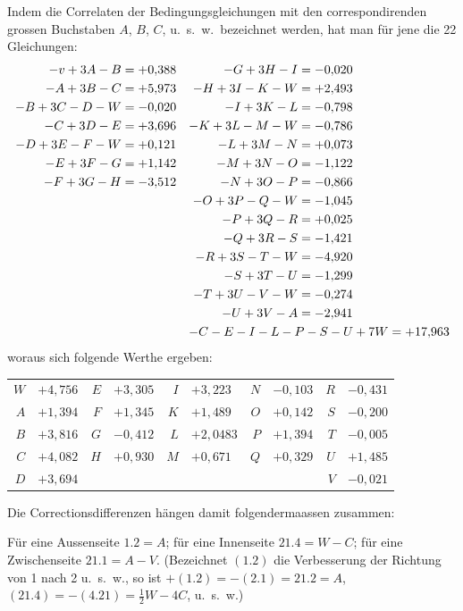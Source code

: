 \documentclass[12pt,a4paper]{article}
\theoremstyle{plain}
\theoremstyle{definition}
\theoremstyle{remark}
\begin{document}
Indem die Correlaten der Bedingungsgleichungen mit den correspondirenden grossen Buchstaben $A$, $B$, $C$, u.\ s.\ w.\ bezeichnet werden, hat man f\"ur jene die 22 Gleichungen:
\begin{align*}
-v + 3A - B &= +0{,}388 & -G + 3H - I &= -0{,}020\\
-A + 3B - C &= +5{,}973 & -H + 3I - K - W &= +2{,}493\\
-B + 3C - D - W &= -0{,}020 & -I + 3K - L &= -0{,}798\\
-C + 3D - E &= +3{,}696 & -K + 3L - M - W &= -0{,}786\\
-D + 3E - F - W &= +0{,}121 & -L + 3M - N &= +0{,}073\\
-E + 3F - G &= +1{,}142 & -M + 3N - O &= -1{,}122\\
-F + 3G - H &= -3{,}512 & -N + 3O - P &= -0{,}866\\
& & -O + 3P - Q - W &= -1{,}045\\
& & -P + 3Q - R &= +0{,}025\\
& & -Q + 3R - S &= -1{,}421\\
& & -R + 3S - T - W &= -4{,}920\\
& & -S + 3T - U &= -1{,}299\\
& & -T + 3U - V - W &= -0{,}274\\
& & -U + 3V - A &= -2{,}941\\
& & \multicolumn{2}{l}{$-C - E - I - L - P - S - U + 7W = +17{,}963$}
\end{align*}
woraus sich folgende Werthe ergeben:
\begin{center}
\begin{tabular}{r@{${}= {}$}lr@{${}= {}$}lr@{${}= {}$}lr@{${}= {}$}lr@{${}= {}$}l}
$W$ & $+4{,}756$ & $E$ & $+3{,}305$ & $I$ & $+3{,}223$ & $N$ & $-0{,}103$ & $R$ & $-0{,}431$\\
$A$ & $+1{,}394$ & $F$ & $+1{,}345$ & $K$ & $+1{,}489$ & $O$ & $+0{,}142$ & $S$ & $-0{,}200$\\
$B$ & $+3{,}816$ & $G$ & $-0{,}412$ & $L$ & $+2{,}0483$ & $P$ & $+1{,}394$ & $T$ & $-0{,}005$\\
$C$ & $+4{,}082$ & $H$ & $+0{,}930$ & $M$ & $+0{,}671$ & $Q$ & $+0{,}329$ & $U$ & $+1{,}485$\\
$D$ & $+3{,}694$ & & & & & & & $V$ & $-0{,}021$
\end{tabular}
\end{center}

Die Correctionsdifferenzen h\"angen damit folgendermaassen zusammen:

F\"ur eine Aussenseite $1.2 = A$; f\"ur eine Innenseite $21.4 = W - C$; f\"ur eine Zwischenseite $21.1 = A - V$. (Bezeichnet $(1.2)$ die Verbesserung der Richtung von 1 nach 2 u.\ s.\ w., so ist $+(1.2) = -(2.1) = 21.2 = A$, $(21.4) = -(4.21) = \tfrac{1}{2}W - 4C$, u.\ s.\ w.)
\end{document}
